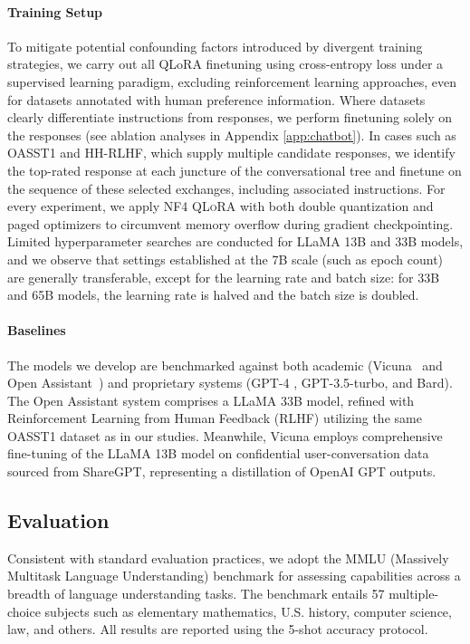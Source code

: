 \paragraph{Training Setup} To mitigate potential confounding factors introduced by divergent training strategies, we carry out all QLoRA finetuning using cross-entropy loss under a supervised learning paradigm, excluding reinforcement learning approaches, even for datasets annotated with human preference information. Where datasets clearly differentiate instructions from responses, we perform finetuning solely on the responses (see ablation analyses in Appendix \ref{app:chatbot}). In cases such as OASST1 and HH-RLHF, which supply multiple candidate responses, we identify the top-rated response at each juncture of the conversational tree and finetune on the sequence of these selected exchanges, including associated instructions. For every experiment, we apply NF4 \textsc{QLoRA} with both double quantization and paged optimizers to circumvent memory overflow during gradient checkpointing. Limited hyperparameter searches are conducted for LLaMA 13B and 33B models, and we observe that settings established at the 7B scale (such as epoch count) are generally transferable, except for the learning rate and batch size: for 33B and 65B models, the learning rate is halved and the batch size is doubled.

\paragraph{Baselines} The models we develop are benchmarked against both academic (Vicuna~\citep{vicuna2023} and Open Assistant~\citep{kopf2023openassistant}) and proprietary systems (GPT-4 \citep{openai2023gpt}, GPT-3.5-turbo, and Bard). The Open Assistant system comprises a LLaMA 33B model, refined with Reinforcement Learning from Human Feedback (RLHF) utilizing the same OASST1 dataset as in our studies. Meanwhile, Vicuna employs comprehensive fine-tuning of the LLaMA 13B model on confidential user-conversation data sourced from ShareGPT, representing a distillation of OpenAI GPT outputs.

\subsection{Evaluation}

Consistent with standard evaluation practices, we adopt the MMLU (Massively Multitask Language Understanding) benchmark \citep{hendrycksmeasuring} for assessing capabilities across a breadth of language understanding tasks. The benchmark entails 57 multiple-choice subjects such as elementary mathematics, U.S. history, computer science, law, and others. All results are reported using the 5-shot accuracy protocol.

